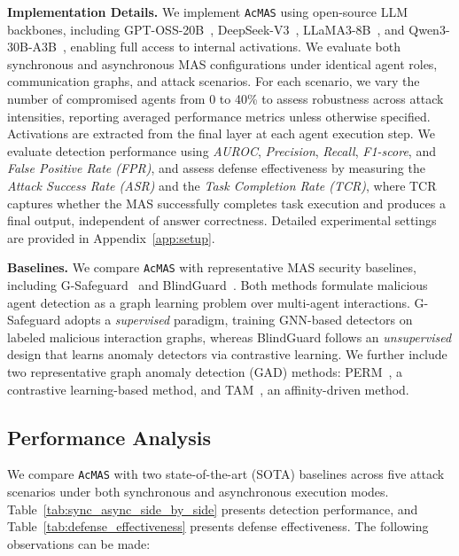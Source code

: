 \documentclass{article}
\newcommand{\app}{\texttt{AcMAS}}
\theoremstyle{plain}
\theoremstyle{definition}
\theoremstyle{remark}
\begin{document}
\noindent\textbf{Implementation Details.} We implement \app{} using open-source LLM backbones, including GPT-OSS-20B~\cite{agarwal2025gpt},
DeepSeek-V3~\cite{liu2024deepseek}, LLaMA3-8B~\cite{touvron2023llama}, and Qwen3-30B-A3B~\cite{yang2025qwen3}, enabling full access to internal
activations.
We evaluate both synchronous and asynchronous MAS configurations under identical
agent roles, communication graphs, and attack scenarios.
For each scenario, we vary the number of compromised agents from 0 to 40\% 
to assess robustness across attack intensities, reporting averaged 
performance metrics unless otherwise specified.
Activations are extracted from the final layer at each agent
execution step.
We evaluate detection performance using \textit{AUROC}, \textit{Precision}, \textit{Recall}, \textit{F1-score}, and \textit{False Positive Rate (FPR)}, and assess defense effectiveness by measuring the \textit{Attack Success Rate (ASR)}
and the \textit{Task Completion Rate (TCR)}, where TCR captures whether the MAS
successfully completes task execution and produces a final output, independent
of answer correctness. Detailed experimental settings are provided in
Appendix~\ref{app:setup}.





\noindent\textbf{Baselines.}
We compare \app{} with representative MAS security baselines, including G-Safeguard~\cite{wang2025g} and BlindGuard~\cite{miao2025blindguard}. Both methods formulate malicious agent detection as a graph learning problem over multi-agent interactions. G-Safeguard adopts a \emph{supervised} paradigm, training GNN-based detectors on labeled malicious interaction graphs, whereas BlindGuard follows an \emph{unsupervised} design that learns anomaly detectors via contrastive learning. We further include two representative graph anomaly detection (GAD) methods: PERM~\cite{PERM}, a contrastive learning-based method, and TAM~\cite{TAM}, an affinity-driven method.




\subsection{Performance Analysis}
We compare \app{} with two state-of-the-art (SOTA) baselines across five attack 
scenarios under both synchronous and asynchronous execution modes. 
Table~\ref{tab:sync_async_side_by_side} presents detection performance, 
and Table~\ref{tab:defense_effectiveness} presents defense effectiveness. 
The following observations can be made:
\end{document}

